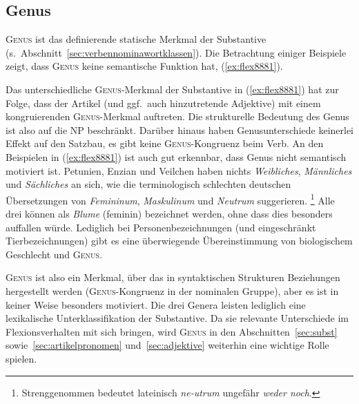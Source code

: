 \subsection{Genus}


\textsc{Genus} ist das definierende statische Merkmal der Substantive (s.\ Abschnitt~\ref{sec:verbennominawortklassen}).
Die Betrachtung einiger Beispiele zeigt, dass \textsc{Genus} keine semantische Funktion hat, (\ref{ex:flex8881}).

\begin{exe}
  \ex \label{ex:flex8881}
  \begin{xlist}
  \end{xlist}
\end{exe}

Das unterschiedliche \textsc{Genus}-Merkmal der Substantive in (\ref{ex:flex8881}) hat zur Folge, dass der Artikel (und ggf.\ auch hinzutretende Adjektive) mit einem kongruierenden \textsc{Genus}-Merkmal auftreten.
Die strukturelle Bedeutung des Genus ist also auf die NP beschränkt.
Darüber hinaus haben Genusunterschiede keinerlei Effekt auf den Satzbau, es gibt \zB keine \textsc{Genus}-Kongruenz beim Verb.
 An den Beispielen in (\ref{ex:flex8881}) ist auch gut erkennbar, dass Genus nicht semantisch motiviert ist.
Petunien, Enzian und Veilchen haben nichts \textit{Weibliches}, \textit{Männliches} und \textit{Sächliches} an sich, wie die terminologisch schlechten deutschen Übersetzungen von \textit{Femininum}, \textit{Maskulinum} und \textit{Neutrum} suggerieren.%
\footnote{Strenggenommen bedeutet lateinisch \textit{ne-utrum} ungefähr \textit{weder noch}.}
Alle drei können als \textit{Blume} (feminin) bezeichnet werden, ohne dass dies besonders auffallen würde.
Lediglich bei Personenbezeichnungen (und eingeschränkt Tierbezeichnungen) gibt es eine überwiegende Übereinstimmung von biologischem Geschlecht und \textsc{Genus}.

\textsc{Genus} ist also ein Merkmal, über das in syntaktischen Strukturen Beziehungen hergestellt werden (\textsc{Genus}-Kongruenz in der nominalen Gruppe), aber es ist in keiner Weise besonders motiviert.
Die drei Genera leisten lediglich eine lexikalische Unterklassifikation der Substantive.
Da sie relevante Unterschiede im Flexionsverhalten mit sich bringen, wird \textsc{Genus} in den Abschnitten~\ref{sec:subst} sowie~\ref{sec:artikelpronomen} und~\ref{sec:adjektive} weiterhin eine wichtige Rolle spielen.


